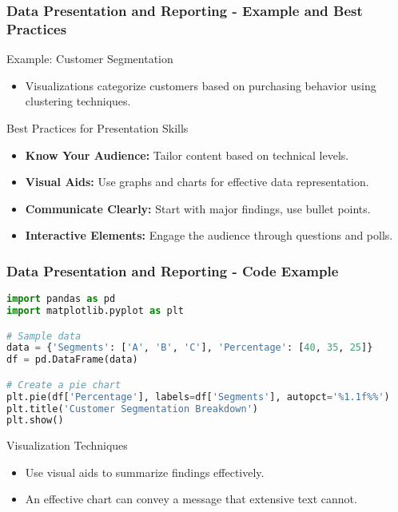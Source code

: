 \documentclass[aspectratio=169]{beamer}
\begin{document}
\begin{frame}[fragile]
    \frametitle{Data Presentation and Reporting - Example and Best Practices}
    \begin{block}{Example: Customer Segmentation}
        \begin{itemize}
            \item Visualizations categorize customers based on purchasing behavior using clustering techniques.
        \end{itemize}
    \end{block}

    \begin{block}{Best Practices for Presentation Skills}
        \begin{itemize}
            \item \textbf{Know Your Audience:} Tailor content based on technical levels.
            \item \textbf{Visual Aids:} Use graphs and charts for effective data representation.
            \item \textbf{Communicate Clearly:} Start with major findings, use bullet points.
            \item \textbf{Interactive Elements:} Engage the audience through questions and polls.
        \end{itemize}
    \end{block}
\end{frame}

\begin{frame}[fragile]
    \frametitle{Data Presentation and Reporting - Code Example}
    \begin{lstlisting}[language=Python]
import pandas as pd
import matplotlib.pyplot as plt

# Sample data
data = {'Segments': ['A', 'B', 'C'], 'Percentage': [40, 35, 25]}
df = pd.DataFrame(data)

# Create a pie chart
plt.pie(df['Percentage'], labels=df['Segments'], autopct='%1.1f%%')
plt.title('Customer Segmentation Breakdown')
plt.show()
    \end{lstlisting}
    
    \begin{block}{Visualization Techniques}
        \begin{itemize}
            \item Use visual aids to summarize findings effectively.
            \item An effective chart can convey a message that extensive text cannot.
        \end{itemize}
    \end{block}
\end{frame}
\end{document}
